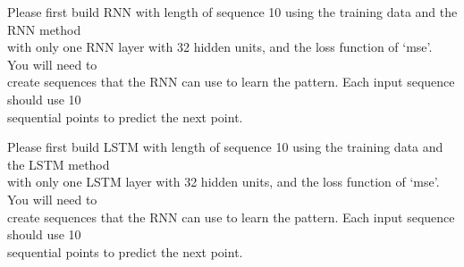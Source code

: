 \documentclass[
]{article}
\newenvironment{Shaded}{\begin{snugshade}}{\end{snugshade}}
\newcommand{\AttributeTok}[1]{\textcolor[rgb]{0.13,0.29,0.53}{#1}}
\newcommand{\DecValTok}[1]{\textcolor[rgb]{0.00,0.00,0.81}{#1}}
\newcommand{\FunctionTok}[1]{\textcolor[rgb]{0.13,0.29,0.53}{\textbf{#1}}}
\newcommand{\NormalTok}[1]{#1}
\newcommand{\OtherTok}[1]{\textcolor[rgb]{0.56,0.35,0.01}{#1}}
\newcommand{\SpecialCharTok}[1]{\textcolor[rgb]{0.81,0.36,0.00}{\textbf{#1}}}
\newcommand{\StringTok}[1]{\textcolor[rgb]{0.31,0.60,0.02}{#1}}
\begin{document}
Please first build RNN with length of sequence 10 using the training
data and the RNN method\\
with only one RNN layer with 32 hidden units, and the loss function of
`mse'. You will need to\\
create sequences that the RNN can use to learn the pattern. Each input
sequence should use 10\\
sequential points to predict the next point.

\begin{Shaded}
\end{Shaded}

Please first build LSTM with length of sequence 10 using the training
data and the LSTM method\\
with only one LSTM layer with 32 hidden units, and the loss function of
`mse'. You will need to\\
create sequences that the RNN can use to learn the pattern. Each input
sequence should use 10\\
sequential points to predict the next point.
\end{document}
